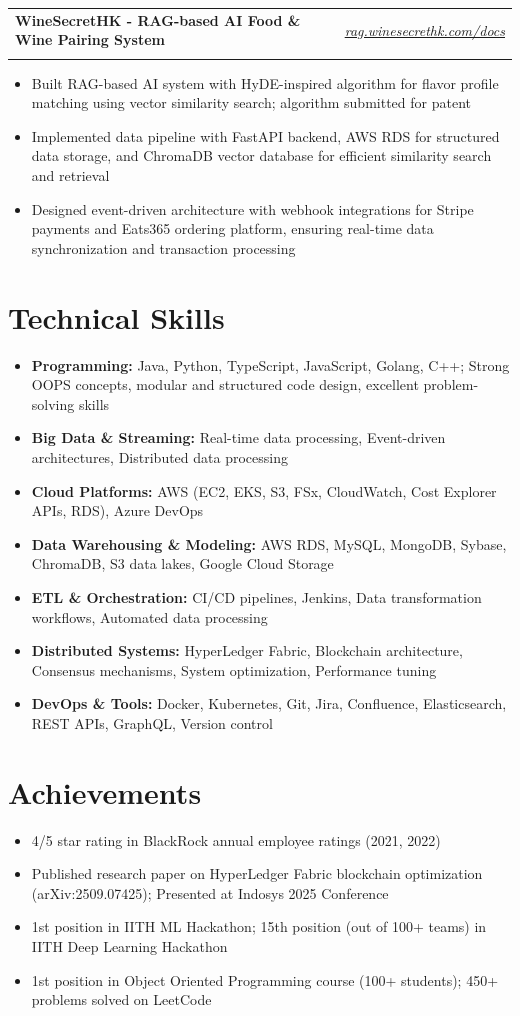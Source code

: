\documentclass[11pt,a4paper]{article}
\makeatletter
\newcommand{\resumeItem}[1]{\item\small{#1}}
\newlength{\resumeLeftCol}
\newlength{\resumeRightCol}
\newcommand{\resumeHeading}[4]{
  \begin{tabular*}{\textwidth}{@{}p{\resumeLeftCol}@{\extracolsep{\fill}}>{\raggedleft\arraybackslash}p{\resumeRightCol}@{}}
    \textbf{#1} & \textit{#2} \\
    & \textit{\ifstrempty{#4}{#3}{#3 \ #4}}
  \end{tabular*}
  \vspace{-4pt}
}
\makeatother
\begin{document}
\resumeHeading{WineSecretHK - RAG-based AI Food \& Wine Pairing System}{\href{https://rag.winesecrethk.com/docs}{rag.winesecrethk.com/docs}}{}{}
\begin{itemize}[leftmargin=*,noitemsep,topsep=0pt]
    \resumeItem{Built RAG-based AI system with HyDE-inspired algorithm for flavor profile matching using vector similarity search; algorithm submitted for patent}
    \resumeItem{Implemented data pipeline with FastAPI backend, AWS RDS for structured data storage, and ChromaDB vector database for efficient similarity search and retrieval}
    \resumeItem{Designed event-driven architecture with webhook integrations for Stripe payments and Eats365 ordering platform, ensuring real-time data synchronization and transaction processing}
\end{itemize}

\section{Technical Skills}
\begin{itemize}[leftmargin=*,noitemsep,topsep=0pt]
    \resumeItem{\textbf{Programming:} Java, Python, TypeScript, JavaScript, Golang, C++; Strong OOPS concepts, modular and structured code design, excellent problem-solving skills}
    \resumeItem{\textbf{Big Data \& Streaming:}  Real-time data processing, Event-driven architectures, Distributed data processing}
    \resumeItem{\textbf{Cloud Platforms:} AWS (EC2, EKS, S3, FSx, CloudWatch, Cost Explorer APIs, RDS), Azure DevOps}
    \resumeItem{\textbf{Data Warehousing \& Modeling:} AWS RDS, MySQL, MongoDB, Sybase, ChromaDB, S3 data lakes, Google Cloud Storage}
    \resumeItem{\textbf{ETL \& Orchestration:} CI/CD pipelines, Jenkins, Data transformation workflows, Automated data processing}
    \resumeItem{\textbf{Distributed Systems:} HyperLedger Fabric, Blockchain architecture, Consensus mechanisms, System optimization, Performance tuning}
    \resumeItem{\textbf{DevOps \& Tools:} Docker, Kubernetes, Git, Jira, Confluence, Elasticsearch, REST APIs, GraphQL, Version control}
\end{itemize}

\section{Achievements}
\begin{itemize}[leftmargin=*,noitemsep,topsep=0pt]
    \resumeItem{4/5 star rating in BlackRock annual employee ratings (2021, 2022)}
    \resumeItem{Published research paper on HyperLedger Fabric blockchain optimization (arXiv:2509.07425); Presented at Indosys 2025 Conference}
    \resumeItem{1st position in IITH ML Hackathon; 15th position (out of 100+ teams) in IITH Deep Learning Hackathon}
    \resumeItem{1st position in Object Oriented Programming course (100+ students); 450+ problems solved on LeetCode}
\end{itemize}
\end{document}
